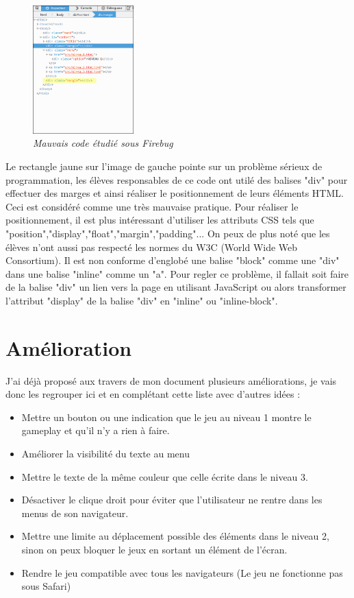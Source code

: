 \documentclass{article}
\begin{document}
\hfill
\begin{figure}
\vspace{-13pt}
\centering
\includegraphics[width=3.9cm]{3}
\caption{\textit{Mauvais code \'etudi\'e sous Firebug}}
\end{figure}
{\hspace*{0.6cm}Le rectangle jaune sur l'image de gauche pointe sur un probl\`eme s\'erieux de programmation, les \'el\`eves responsables de ce code ont util\'e des balises "div" pour effectuer des marges et ainsi r\'ealiser le positionnement de leurs \'el\'ements HTML. Ceci est consid\'er\'e comme une tr\`es mauvaise pratique. Pour r\'ealiser le positionnement, il est plus int\'eressant d'utiliser les attributs CSS tels que "position","display","float","margin","padding"... On peux de plus not\'e que les \'el\`eves n'ont aussi pas respect\'e les normes du W3C (World Wide Web Consortium). Il est non conforme d'englob\'e une balise "block" comme une "div" dans une balise "inline" comme un "a". Pour regler ce probl\`eme, il fallait soit faire de la balise "div" un lien vers la page en utilisant JavaScript ou alors transformer l'attribut "display" de la balise "div" en "inline" ou "inline-block".}\\

\newpage

\section{Am\'elioration}

\hspace*{0.6cm}J'ai d\'ej\`a propos\'e aux travers de mon document plusieurs am\'eliorations, je vais donc les regrouper ici et en compl\'etant cette liste avec d'autres id\'ees :\\
\begin{itemize}
  \item Mettre un bouton ou une indication que le jeu au niveau 1 montre le gameplay et qu'il n'y a rien \`a faire.
  \item Am\'eliorer la visibilit\'e du texte au menu
  \item Mettre le texte de la m\^eme couleur que celle \'ecrite dans le niveau 3.
  \item D\'esactiver le clique droit pour \'eviter que l'utilisateur ne rentre dans les menus de son navigateur.
  \item Mettre une limite au d\'eplacement possible des \'el\'ements dans le niveau 2, sinon on peux bloquer le jeux en sortant un \'el\'ement de l'\'ecran.
  \item Rendre le jeu compatible avec tous les navigateurs (Le jeu ne fonctionne pas sous Safari)
\end{itemize}
\end{document}

